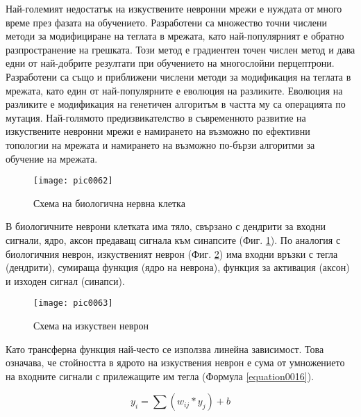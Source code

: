 Най-големият недостатък на изкуствените невронни мрежи е нуждата от много време през фазата на обучението. Разработени са множество точни числени методи за модифициране на теглата в мрежата, като най-популярният е обратно разпространение на грешката. Този метод е градиентен точен числен метод и дава едни от най-добрите резултати при обучението на многослойни перцептрони. Разработени са също и приближени числени методи за модификация на теглата в мрежата, като един от най-популярните е еволюция на разликите. Еволюция на разликите е модификация на генетичен алгоритъм в частта му са операцията по мутация. Най-голямото предизвикателство в съвременното развитие на изкуствените невронни мрежи е намирането на възможно по ефективни топологии на мрежата и намирането на възможно по-бързи алгоритми за обучение на мрежата. 

\begin{figure}[h!]
  \centering
  \texttt{[image: pic0062]}
  \caption{Схема на биологична нервна клетка}
\label{figure0062}
\end{figure}
\FloatBarrier

В биологичните неврони клетката има тяло, свързано с дендрити за входни сигнали, ядро, аксон предаващ сигнала към синапсите (Фиг. \ref{figure0062}). По аналогия с биологичния неврон, изкуственият неврон (Фиг. \ref{figure0063}) има входни връзки с тегла (дендрити), сумираща функция (ядро на неврона), функция за активация (аксон) и изходен сигнал (синапси).

\begin{figure}[h!]
  \centering
  \texttt{[image: pic0063]}
  \caption{Схема на изкуствен неврон}
\label{figure0063}
\end{figure}
\FloatBarrier

Като трансферна функция най-често се използва линейна зависимост. Това означава, че стойността в ядрото на изкуствения неврон е сума от умножението на входните сигнали с прилежащите им тегла (Формула \ref{equation0016}). 

\begin{equation}
y_i = \sum{(w_{ij}*y_j)} + b
\label{equation0016}
\end{equation}

